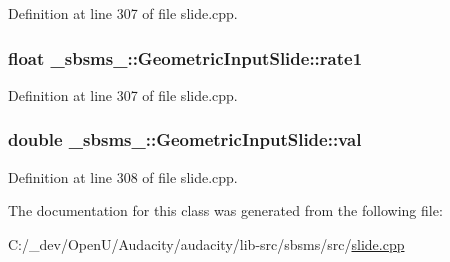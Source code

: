 Definition at line 307 of file slide.\+cpp.

\subsubsection[{\texorpdfstring{rate1}{rate1}}]{\setlength{\rightskip}{0pt plus 5cm}float \+\_\+sbsms\+\_\+\+::\+Geometric\+Input\+Slide\+::rate1\hspace{0.3cm}{\ttfamily [protected]}}\hypertarget{class__sbsms___1_1_geometric_input_slide_a79ed8d34b422f99a09b97805a26cb845}{}\label{class__sbsms___1_1_geometric_input_slide_a79ed8d34b422f99a09b97805a26cb845}


Definition at line 307 of file slide.\+cpp.

\subsubsection[{\texorpdfstring{val}{val}}]{\setlength{\rightskip}{0pt plus 5cm}double \+\_\+sbsms\+\_\+\+::\+Geometric\+Input\+Slide\+::val\hspace{0.3cm}{\ttfamily [protected]}}\hypertarget{class__sbsms___1_1_geometric_input_slide_a8fd15c02b81bfcded96edf745dcba704}{}\label{class__sbsms___1_1_geometric_input_slide_a8fd15c02b81bfcded96edf745dcba704}


Definition at line 308 of file slide.\+cpp.



The documentation for this class was generated from the following file\+:\begin{DoxyCompactItemize}
\item 
C\+:/\+\_\+dev/\+Open\+U/\+Audacity/audacity/lib-\/src/sbsms/src/\hyperlink{slide_8cpp}{slide.\+cpp}\end{DoxyCompactItemize}
